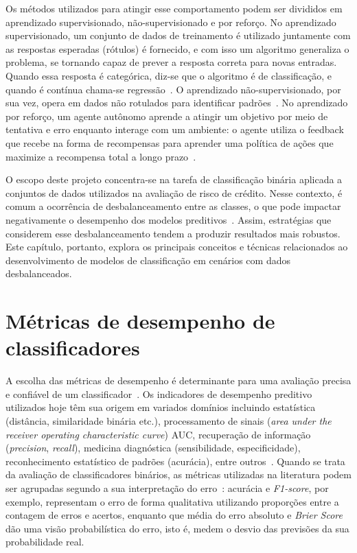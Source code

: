 Os métodos utilizados para atingir esse comportamento podem ser divididos em aprendizado supervisionado, não-supervisionado e por reforço. No aprendizado supervisionado, um conjunto de dados de treinamento é utilizado juntamente com as respostas esperadas (rótulos) é fornecido, e com isso um algoritmo generaliza o problema, se tornando capaz de prever a resposta correta para novas entradas. Quando essa resposta é categórica, diz-se que o algoritmo é de classificação, e quando é contínua chama-se regressão~\cite{SindhuMeena2020}. O aprendizado não-supervisionado, por sua vez, opera em dados não rotulados para identificar padrões~\cite{Dike2018}. No aprendizado por reforço, um agente autônomo aprende a atingir um objetivo por meio de tentativa e erro enquanto interage com um ambiente: o agente utiliza o feedback que recebe na forma de recompensas para aprender uma política de ações que maximize a recompensa total a longo prazo~\cite{Sutton2018}.

O escopo deste projeto concentra-se na tarefa de classificação binária aplicada a conjuntos de dados utilizados na avaliação de risco de crédito. Nesse contexto, é comum a ocorrência de desbalanceamento entre as classes, o que pode impactar negativamente o desempenho dos modelos preditivos~\cite{Namvar2018}. Assim, estratégias que considerem esse desbalanceamento tendem a produzir resultados mais robustos. Este capítulo, portanto, explora os principais conceitos e técnicas relacionados ao desenvolvimento de modelos de classificação em cenários com dados desbalanceados.

\section{Métricas de desempenho de classificadores}

A escolha das métricas de desempenho é determinante para uma avaliação precisa e confiável de um classificador~\cite{Gaudreault2021}. Os indicadores de desempenho preditivo utilizados hoje têm sua origem em variados domínios incluindo estatística (distância, similaridade binária etc.), processamento de sinais (\textit{area under the receiver operating characteristic curve}) AUC, recuperação de informação (\textit{precision}, \textit{recall}), medicina diagnóstica (sensibilidade, especificidade), reconhecimento estatístico de padrões (acurácia), entre outros~\cite{Canbek2023}. Quando se trata da avaliação de classificadores binários, as métricas utilizadas na literatura podem ser agrupadas segundo a sua interpretação do erro~\cite{Ferri2009}:  acurácia e \textit{F1-score}, por exemplo, representam o erro de forma qualitativa utilizando proporções entre a contagem de erros e acertos, enquanto que média do erro absoluto e \textit{Brier Score} dão uma visão probabilística do erro, isto é, medem o desvio das previsões da sua probabilidade real.

